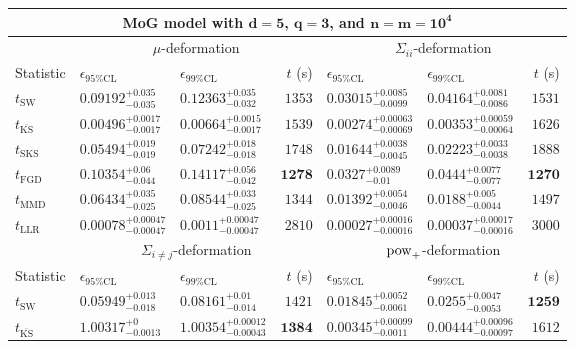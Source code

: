 \begin{tabular}{l|llr|llr}
	\toprule
	\multicolumn{7}{c}{{\bf MoG model with $\mathbf{d=5}$, $\mathbf{q=3}$, and $\mathbf{n=m=10^{4}}$}} \\
	\toprule
	\multicolumn{1}{c}{} & \multicolumn{3}{c}{$\mu$-deformation} & \multicolumn{3}{c}{$\Sigma_{ii}$-deformation} \\
	Statistic & $\epsilon_{95\%\mathrm{CL}}$ & $\epsilon_{99\%\mathrm{CL}}$ & $t$ (s) & $\epsilon_{95\%\mathrm{CL}}$ & $\epsilon_{99\%\mathrm{CL}}$ & $t$ (s) \\
	\midrule
	$t_{\mathrm{SW}}$ & $0.09192_{-0.035}^{+0.035}$ & $0.12363_{-0.032}^{+0.035}$ & $1353$ & $0.03015_{-0.0099}^{+0.0085}$ & $0.04164_{-0.0086}^{+0.0081}$ & $1531$ \\
	$t_{\overline{\mathrm{KS}}}$ & ${\mathbf{0.00496_{-0.0017}^{+0.0017}}}$ & ${\mathbf{0.00664_{-0.0017}^{+0.0015}}}$ & $1539$ & ${\mathbf{0.00274_{-0.00069}^{+0.00063}}}$ & ${\mathbf{0.00353_{-0.00064}^{+0.00059}}}$ & $1626$ \\
	$t_{\mathrm{SKS}}$ & $0.05494_{-0.019}^{+0.019}$ & $0.07242_{-0.018}^{+0.018}$ & $1748$ & $0.01644_{-0.0045}^{+0.0038}$ & $0.02223_{-0.0038}^{+0.0033}$ & $1888$ \\
	$t_{\mathrm{FGD}}$ & $0.10354_{-0.044}^{+0.06}$ & $0.14117_{-0.042}^{+0.056}$ & ${\mathbf{1278}}$ & $0.0327_{-0.01}^{+0.0089}$ & $0.0444_{-0.0077}^{+0.0077}$ & ${\mathbf{1270}}$ \\
	$t_{\mathrm{MMD}}$ & $0.06434_{-0.025}^{+0.035}$ & $0.08544_{-0.025}^{+0.033}$ & $1344$ & $0.01392_{-0.0046}^{+0.0054}$ & $0.0188_{-0.0044}^{+0.005}$ & $1497$ \\
	$t_{\mathrm{LLR}}$ & $0.00078_{-0.00047}^{+0.00047}$ & $0.0011_{-0.00047}^{+0.00047}$ & $2810$ & $0.00027_{-0.00016}^{+0.00016}$ & $0.00037_{-0.00016}^{+0.00017}$ & $3000$ \\
	\toprule
	\multicolumn{1}{c}{} & \multicolumn{3}{c}{$\Sigma_{i\neq j}$-deformation} & \multicolumn{3}{c}{$\rm{pow}_{+}$-deformation} \\
	Statistic & $\epsilon_{95\%\mathrm{CL}}$ & $\epsilon_{99\%\mathrm{CL}}$ & $t$ (s) & $\epsilon_{95\%\mathrm{CL}}$ & $\epsilon_{99\%\mathrm{CL}}$ & $t$ (s) \\
	\midrule
	$t_{\mathrm{SW}}$ & $0.05949_{-0.018}^{+0.013}$ & $0.08161_{-0.014}^{+0.01}$ & $1421$ & $0.01845_{-0.0061}^{+0.0052}$ & $0.0255_{-0.0053}^{+0.0047}$ & ${\mathbf{1259}}$ \\
	$t_{\overline{\mathrm{KS}}}$ & $1.00317_{-0.0013}^{+0}$ & $1.00354_{-0.00043}^{+0.00012}$ & ${\mathbf{1384}}$ & ${\mathbf{0.00345_{-0.0011}^{+0.00099}}}$ & ${\mathbf{0.00444_{-0.00097}^{+0.00096}}}$ & $1612$ \\

\end{tabular}

